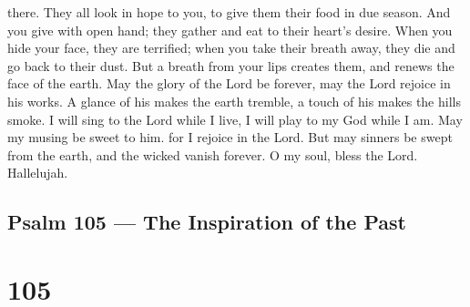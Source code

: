 there.  They all look in hope to you, to give them their
food in due season.  And you give with open hand; they
gather and eat to their heart's desire.  When you hide your
face, they are terrified; when you take their breath away, they die and
go back to their dust.  But a breath from your lips creates
them, and renews the face of the earth.  May the glory of
the Lord be forever, may the Lord rejoice in his works.  A
glance of his makes the earth tremble, a touch of his makes the hills
smoke.  I will sing to the Lord while I live, I will play
to my God while I am.  May my musing be sweet to him. for I
rejoice in the Lord.  But may sinners be swept from the
earth, and the wicked vanish forever. O my soul, bless the Lord.
Hallelujah.

\hypertarget{psalm-105-the-inspiration-of-the-past}{%
\subsection{Psalm 105 --- The Inspiration of the
Past}\label{psalm-105-the-inspiration-of-the-past}}

\hypertarget{section-104}{%
\section{105}\label{section-104}}

